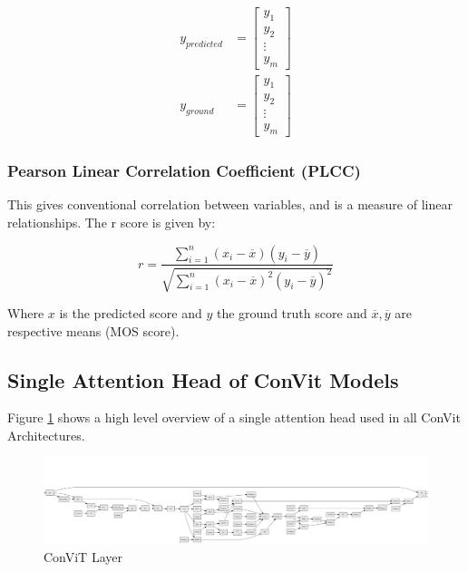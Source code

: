   \begin{align}
           y_{predicted} &= \begin{bmatrix}
           y_{1} \\
           y_{2} \\
           \vdots \\
           y_{m}
         \end{bmatrix} \\
         y_{ground} &= \begin{bmatrix}
           y_{1} \\
           y_{2} \\
           \vdots \\
           y_{m}
         \end{bmatrix}
  \end{align}
  
\subsubsection{Pearson Linear Correlation Coefficient (PLCC)}
This gives conventional correlation between variables, and is a measure of linear relationships. The r score is given by: 


\begin{equation}
r = \frac{{}\sum_{i=1}^{n} (x_i - \overline{x})(y_i -\overline{y})}{\sqrt{\sum_{i=1}^{n} (x_i -\overline{x})^2(y_i - \overline{y})^2}}
\label{PLCC} 
\end{equation}

Where $x$ is the predicted score and $y$ the ground truth score and $\overline{x},\overline{y}$ are respective means (MOS score). 

\newpage

\subsection{Single Attention Head of ConVit Models}
Figure \ref{fig:Convit_arch_} shows a high level overview of a single attention head used in all ConVit Architectures.

\begin{figure}[ht!]
    \centering
    \includegraphics[width=1\textwidth,angle=90]{figures/research_methadology/model_overview.png}
    \caption{ConViT Layer}
    \label{fig:Convit_arch_}
\end{figure}


